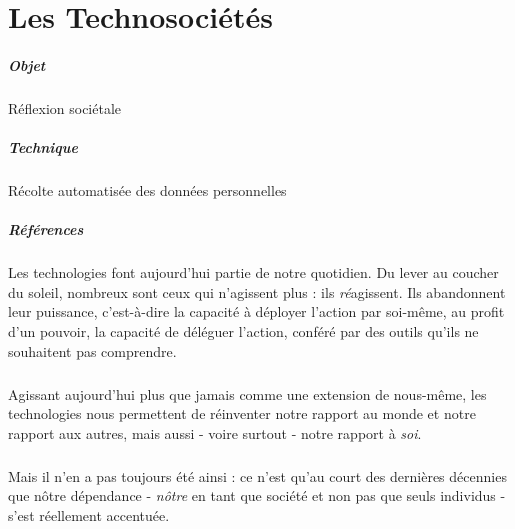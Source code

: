 \chapter{Les Technosociétés}
\paragraph{Objet} Réflexion sociétale
\paragraph{Technique} Récolte automatisée des données personnelles
\paragraph{Références}
\cite{Damasio0}
\cite{Damasio1}
\cite{Damasio2}
\cite{Deleuze0}
\cite{Foucault0}
\cite{Huxley0}
\cite{Klein0}
\cite{Marx0}
\cite{Marx1}
\cite{Moore0}
\cite{Negri0}
\cite{Nietzsche0}
\cite{Orwell0}
\cite{Pieces0}
\cite{Rabhi0}
\cite{Rabhi1}
\cite{Rufin0}
\cite{Arte0}
\cite{GhostInTheShell}
\cite{Gunnm}
\cite{PsychoPass}

\paragraph{} Les technologies font aujourd'hui partie de notre quotidien. Du lever au coucher du soleil, nombreux sont
ceux qui n'agissent plus : ils \emph{ré}agissent. Ils abandonnent leur puissance, c'est-à-dire la capacité à déployer
l'action par soi-même, au profit d'un pouvoir, la capacité de déléguer l'action, conféré par des outils qu'ils ne 
souhaitent pas comprendre.

\paragraph{} Agissant aujourd'hui plus que jamais comme une extension de nous-même, les technologies nous permettent de
réinventer notre rapport au monde et notre rapport aux autres, mais aussi - voire surtout - notre rapport à \emph{soi}.
\cite{Damasio2}

\paragraph{} Mais il n'en a pas toujours été ainsi : ce n'est qu'au court des dernières décennies que nôtre dépendance
- \emph{nôtre} en tant que société et non pas que seuls individus - s'est réellement accentuée.



 
